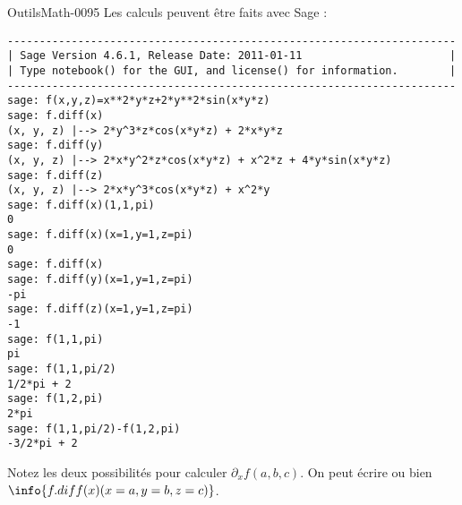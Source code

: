 \begin{corrige}{OutilsMath-0095}
    Les calculs peuvent être faits avec Sage :
    \begin{verbatim}
----------------------------------------------------------------------
| Sage Version 4.6.1, Release Date: 2011-01-11                       |
| Type notebook() for the GUI, and license() for information.        |
----------------------------------------------------------------------
sage: f(x,y,z)=x**2*y*z+2*y**2*sin(x*y*z)
sage: f.diff(x)
(x, y, z) |--> 2*y^3*z*cos(x*y*z) + 2*x*y*z
sage: f.diff(y)
(x, y, z) |--> 2*x*y^2*z*cos(x*y*z) + x^2*z + 4*y*sin(x*y*z)
sage: f.diff(z)
(x, y, z) |--> 2*x*y^3*cos(x*y*z) + x^2*y
sage: f.diff(x)(1,1,pi)
0
sage: f.diff(x)(x=1,y=1,z=pi)
0
sage: f.diff(x)
sage: f.diff(y)(x=1,y=1,z=pi)
-pi
sage: f.diff(z)(x=1,y=1,z=pi)
-1
sage: f(1,1,pi)
pi
sage: f(1,1,pi/2)
1/2*pi + 2
sage: f(1,2,pi)  
2*pi
sage: f(1,1,pi/2)-f(1,2,pi)
-3/2*pi + 2
    \end{verbatim}
    Notez les deux possibilités pour calculer $\partial_xf(a,b,c)$. On peut écrire  ou bien $\info{f.diff(x)(x=a,y=b,z=c)}$.
    

\end{corrige}
